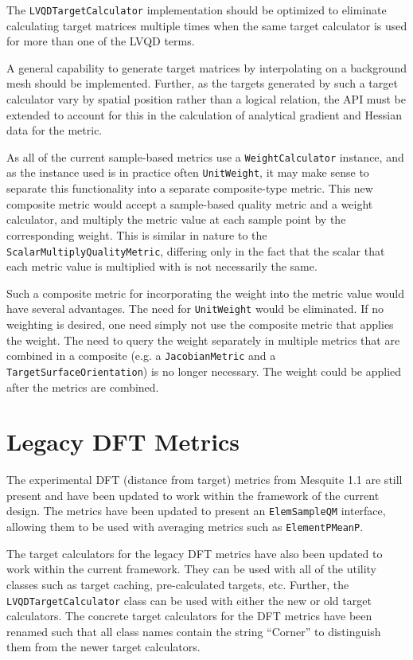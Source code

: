 \documentclass{article}
\begin{document}
The \texttt{LVQDTargetCalculator} implementation should be optimized to eliminate calculating target matrices multiple times when the same target calculator is used for more than one of the LVQD terms.

A general capability to generate target matrices by interpolating on a background mesh should be implemented.  Further, as the targets generated by such a target calculator vary by spatial position rather than a logical relation, the API must be extended to account for this in the calculation of analytical gradient and Hessian data for the metric.
 
As all of the current sample-based metrics use a \texttt{WeightCalculator} instance, and as the instance used is in practice often \texttt{UnitWeight}, it may make sense to separate this functionality into a separate composite-type metric.  This new composite metric would accept a sample-based quality metric and a weight calculator, and multiply the metric value at each sample point by the corresponding weight.  This is similar in nature to the \texttt{ScalarMultiplyQualityMetric}, differing only in the fact that the scalar that each metric value is multiplied with is not necessarily the same.  

Such a composite metric for incorporating the weight into the metric value would have several advantages.  The need for \texttt{UnitWeight} would be eliminated.  If no weighting is desired, one need simply not use the composite metric that applies the weight.  The need to query the weight separately in multiple metrics that are combined in a composite (e.g. a \texttt{JacobianMetric} and a  \texttt{TargetSurfaceOrientation}) is no longer necessary.  The weight could be applied after the metrics are combined.

\section{Legacy DFT Metrics}
\label{sec:DFT}

The experimental DFT (distance from target) metrics from Mesquite 1.1 are still present and have been updated to work within the framework of the current design.  The metrics have been updated to present an \texttt{ElemSampleQM} interface, allowing them to be used with averaging metrics such as \texttt{ElementPMeanP}.  

The target calculators for the legacy DFT metrics have also been updated to work within the current framework.  They can be used with all of the utility classes such as target caching, pre-calculated targets, etc.  Further, the \texttt{LVQDTargetCalculator} class can be used with either the new or old target calculators.  The concrete target calculators for the DFT metrics have been renamed such that all class names contain the string ``Corner'' to distinguish them from the newer target calculators.  
\end{document}
